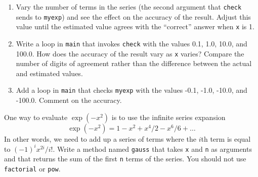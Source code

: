 \begin{exercise}
\begin{enumerate}
\item Vary the number of terms in the series (the second argument
that {\tt check} sends to {\tt myexp}) and see the effect on
the accuracy of the result.  Adjust this value until the estimated
value agrees with the ``correct'' answer when {\tt x} is 1.

\item Write a loop in {\tt main} that invokes {\tt check} with the
values 0.1, 1.0, 10.0, and 100.0.  How does the accuracy of the
result vary as {\tt x} varies?  Compare the number of digits of
agreement rather than the difference between the actual and
estimated values.

\item Add a loop in {\tt main} that checks {\tt myexp} with the values
-0.1, -1.0, -10.0, and -100.0.  Comment on the accuracy.

\end{enumerate}
\end{exercise}


\begin{exercise}
One way to evaluate $\exp(-x^2)$ is to use the infinite series expansion
%
\begin{equation*}
\exp(-x^2) = 1 - x^2 + x^4/2 - x^6/6 + \ldots
\end{equation*}
%
In other words, we need to add up a series of terms where the $i$th
term is equal to $(-1)^i x^{2i} / i!$.  Write a method named {\tt gauss}
that takes {\tt x} and {\tt n} as arguments and that returns the sum
of the first {\tt n} terms of the series.  You should not use {\tt
factorial} or {\tt pow}.
\end{exercise}


